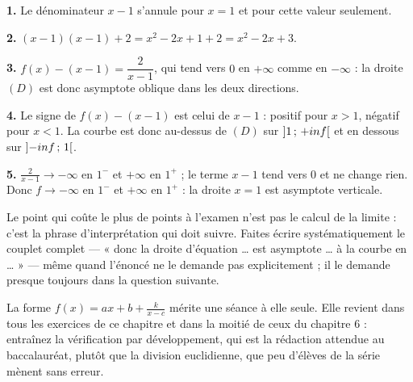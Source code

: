 \begin{corrige}
\textbf{1.} Le dénominateur $x-1$ s'annule pour $x = 1$ et pour cette valeur
seulement.

\textbf{2.} $(x-1)(x-1)+2 = x^{2}-2x+1+2 = x^{2}-2x+3$. \checkmark

\textbf{3.} $f(x)-(x-1) = \dfrac{2}{x-1}$, qui tend vers $0$ en $+\infty$
comme en $-\infty$ : la droite $(D)$ est donc asymptote oblique dans les
deux directions.

\textbf{4.} Le signe de $f(x)-(x-1)$ est celui de $x-1$ : positif pour
$x>1$, négatif pour $x<1$. La courbe est donc au-dessus de $(D)$ sur
$\left]1\,;\,+inf\right[$ et en dessous sur $\left]-inf\,;\,1\right[$.

\textbf{5.} $\frac{2}{x-1} \to -\infty$ en $1^{-}$ et $+\infty$ en $1^{+}$ ;
le terme $x-1$ tend vers $0$ et ne change rien. Donc
$f \to -\infty$ en $1^{-}$ et $+\infty$ en $1^{+}$ : la droite $x = 1$ est
asymptote verticale.
\end{corrige}

\begin{notepourlaclasse}
Le point qui coûte le plus de points à l'examen n'est pas le calcul de la
limite : c'est la phrase d'interprétation qui doit suivre. Faites écrire
systématiquement le couplet complet — « donc la droite d'équation … est
asymptote … à la courbe en … » — même quand l'énoncé ne le demande pas
explicitement ; il le demande presque toujours dans la question suivante.

La forme $f(x) = ax+b+\frac{k}{x-c}$ mérite une séance à elle seule. Elle
revient dans tous les exercices de ce chapitre et dans la moitié de ceux du
chapitre 6 : entraînez la vérification par développement, qui est la
rédaction attendue au baccalauréat, plutôt que la division euclidienne, que
peu d'élèves de la série mènent sans erreur.
\end{notepourlaclasse}
